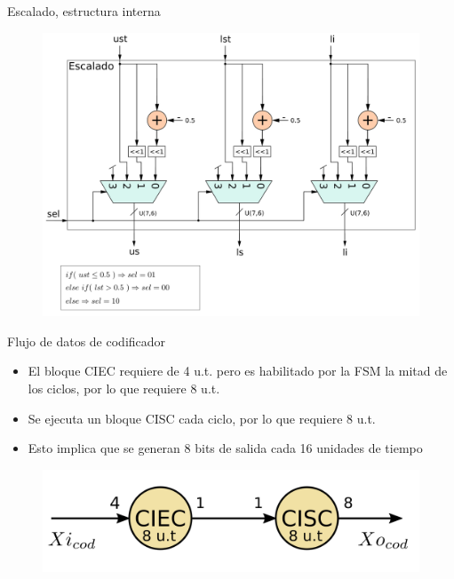 \documentclass[xcolor=table]{beamer}
\begin{document}
\begin{frame}{Escalado, estructura interna}
 \begin{figure}
  \centering
  \includegraphics[width=0.70\paperwidth]{Diagramas/escalado.png}%
\end{figure}
\end{frame}

\begin{frame}{Flujo de datos de codificador}
    \begin{itemize}
        \item El bloque CIEC requiere de 4 u.t. pero es habilitado por la FSM la mitad de los ciclos, por lo que requiere 8 u.t.
        \item Se ejecuta un bloque CISC cada ciclo, por lo que requiere 8 u.t.
        \item Esto implica que se generan 8 bits de salida cada 16 unidades de tiempo
    \end{itemize}
 \begin{figure}
  \centering
  \includegraphics[width=0.70\paperwidth]{Diagramas/grafo_cod.png}%
\end{figure}
\end{frame}
\end{document}
